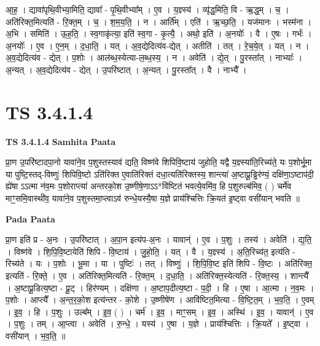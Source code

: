 \documentclass[17pt]{extarticle}
\begin{document}
आ॒ह॒ । द्यावा॑पृथि॒वीभ्या॒मिति॒ द्यावा᳚ - पृ॒थि॒वीभ्या᳚म् । ए॒व । य॒ज्ञ्स्य॑ । व्यृ॑द्ध॒मिति॒ वि - ऋ॒द्ध॒म् । च॒ । अति॑रिक्त॒मित्यति॑ - रि॒क्त॒म् । च॒ । श॒म॒य॒ति॒ । न । आर्ति᳚म् । एति॑ । ऋ॒च्छ॒ति॒ । यज॑मानः । भस्म॑ना । अ॒भि । समिति॑ । ऊ॒ह॒ति॒ । स्व॒गाकृ॑त्या॒ इति॑ स्व॒गा - कृ॒त्यै॒ । अथो॒ इति॑ । अ॒नयोः᳚ । वै । ए॒षः । गर्भः॑ । अ॒नयोः᳚ । ए॒व । ए॒न॒म् । द॒धा॒ति॒ । यत् । अ॒व॒द्येदित्य॑व-द्येत् । अतीति॑ । तत् । रे॒च॒ये॒त् । यत् । न । अ॒व॒द्येदित्य॑व - द्येत् । प॒शोः । आल॑ब्ध॒स्येत्या-ल॒ब्ध॒स्य॒ । न । अवेति॑ । द्ये॒त् । पु॒रस्ता᳚त् । नाभ्याः᳚ । अ॒न्यत् । अ॒व॒द्येदित्य॑व - द्येत् । उ॒परि॑ष्टात् । अ॒न्यत् । पु॒रस्ता᳚त् । वै । नाभ्यै᳚ ।  \newline





\section{ TS 3.4.1.4 }

\textbf{TS 3.4.1.4 } \newline
\textbf{Samhita Paata} \newline

प्रा॒ण उ॒परि॑ष्टादपा॒नो यावा॑ने॒व प॒शुस्तस्याव॑ द्यति॒ विष्ण॑वे शिपिवि॒ष्टाय॑ जुहोति॒ यद्वै य॒ज्ञ्स्या॑ति॒रिच्य॑ते॒ यः प॒शोर्भू॒मा या पुष्टि॒स्तद्-विष्णुः॑ शिपिवि॒ष्टो ऽति॑रिक्त ए॒वाति॑रिक्तं दधा॒त्यति॑रिक्तस्य॒ शान्त्या॑ अ॒ष्टाप्रू॒ड्ढिर॑ण्यं॒ दक्षि॑णा॒ऽष्टाप॑दी॒ ह्ये॑षा ऽऽत्मा न॑व॒मः प॒शोराप्त्या॑ अन्तरको॒श उ॒ष्णीषे॒णाऽऽ*वि॑ष्टितं भवत्ये॒वमि॑व॒ हि प॒शुरुल्ब॑मिव॒ ( ) चर्मे॑व माꣳ॒॒समि॒वास्थी॑व॒ यावा॑ने॒व प॒शुस्तमा॒प्त्वाऽव॑ रुन्धे॒यस्यै॒षा य॒ज्ञे प्राय॑श्चित्तिः क्रि॒यत॑ इ॒ष्ट्वा वसी॑यान् भवति ॥ \newline

\textbf{Pada Paata} \newline

प्रा॒ण इति॑ प्र - अ॒नः । उ॒परि॑ष्टात् । अ॒पा॒न इत्य॑प-अ॒नः । यावान्॑ । ए॒व । प॒शुः । तस्य॑ । अवेति॑ । द्य॒ति॒ । विष्ण॑वे । शि॒पि॒वि॒ष्टायेति॑ शिपि - वि॒ष्टाय॑ । जु॒हो॒ति॒ । यत् । वै । य॒ज्ञ्स्य॑ । अ॒ति॒रिच्य॑त॒ इत्य॑ति - रिच्य॑ते । यः । प॒शोः । भू॒मा । या । पुष्टिः॑ । तत् । विष्णुः॑ । शि॒पि॒वि॒ष्ट इति॑ शिपि - वि॒ष्टः । अति॑रिक्त॒ इत्यति॑ - रि॒क्ते॒ । ए॒व । अति॑रिक्त॒मित्यति॑ - रि॒क्त॒म् । द॒धा॒ति॒ । अति॑रिक्त॒स्येत्यति॑ - रि॒क्त॒स्य॒ । शान्त्यै᳚ । अ॒ष्टाप्रू॒डित्य॒ष्टा - प्रू॒ट् । हिर॑ण्यम् । दक्षि॑णा । अ॒ष्टाप॒दीत्य॒ष्टा - प॒दी॒ । हि । ए॒षा । आ॒त्मा । न॒व॒मः । प॒शोः । आप्त्यै᳚ । अ॒न्त॒र॒को॒श इत्य॑न्तर - को॒शे । उ॒ष्णीषे॑ण । आवि॑ष्टित॒मित्या - वि॒ष्टि॒त॒म् । भ॒व॒ति॒ । ए॒वम् । इ॒व॒ । हि । प॒शुः । उल्ब᳚म् । इ॒व॒ ( ) । चर्म॑ । इ॒व॒ । माꣳ॒॒सम् । इ॒व॒ । अस्थि॑ । इ॒व॒ । यावान्॑ । ए॒व । प॒शुः । तम् । आ॒प्त्वा । अवेति॑ । रु॒न्धे॒ । यस्य॑ । ए॒षा । य॒ज्ञे । प्राय॑श्चित्तिः । क्रि॒यते᳚ । इ॒ष्ट्वा । वसी॑यान् । भ॒व॒ति॒ ॥  \newline
\end{document}
